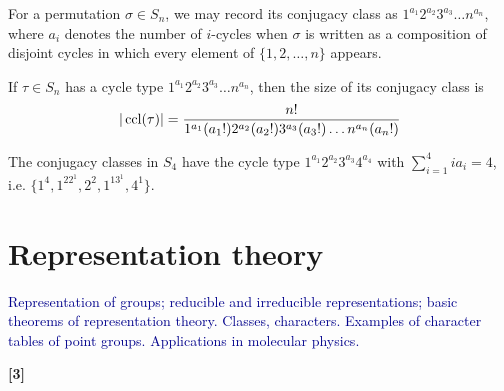 \documentclass[a4paper]{article}
\begin{document}
\begin{defi}
For a permutation $\sigma\in S_n$, we may record its conjugacy class as $1^{a_1}2^{a_2}3^{a_3}\dots n^{a_n}$, where $a_i$ denotes the number of $i$-cycles when $\sigma$ is written as a composition of disjoint cycles in which every element of $\{1,2,\dots,n\}$ appears.
\end{defi}
\begin{cor}
If $\tau\in S_n$ has a cycle type $1^{a_1}2^{a_2}3^{a_3}\dots n^{a_n}$, then the size of its conjugacy class is
$$|\operatorname{ccl}(\tau)|=\frac{n!}{1^{a_1}(a_1!)2^{a_2}(a_2!)3^{a_3}(a_3!)\dots n^{a_n}(a_n!)}$$
\end{cor}
\begin{eg}
The conjugacy classes in $S_4$ have the cycle type $1^{a_1}2^{a_2}3^{a_3}4^{a_4}$ with $\sum_{i=1}^4ia_i=4$, i.e. $\{1^4,1^22^1,2^2,1^13^1,4^1\}$.
\end{eg}

\newpage
\section{Representation theory}
{\small\textcolor{darkblue}{Representation of groups; reducible and irreducible representations; basic theorems of representation theory. Classes, characters. Examples of character tables of point groups. Applications in molecular physics.}

\hfill\textbf{[3]}}
\end{document}
